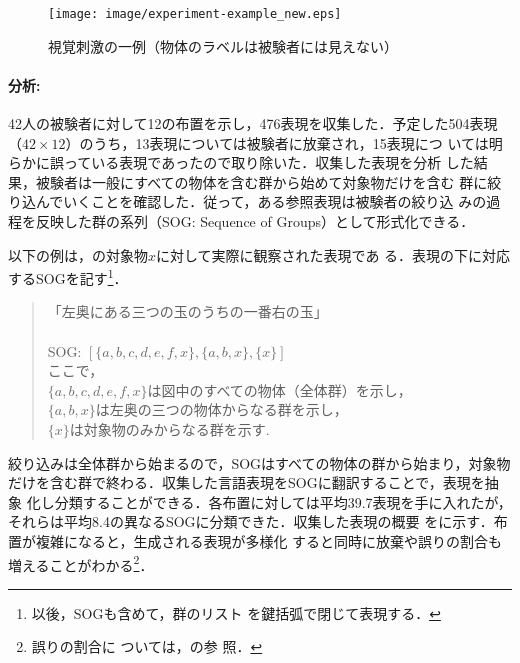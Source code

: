 \documentclass{nlp}
\begin{document}
\begin{figure}[tb]
  \centering
      \texttt{[image: image/experiment-example\_new.eps]}
      \caption{視覚刺激の一例（物体のラベルは被験者には見えない）}
      \label{experiment}
\end{figure}

\paragraph{分析:}

42人の被験者に対して12の布置を示し，476表現を収集した．予定した504表現
（$42 \times 12$）のうち，13表現については被験者に放棄され，15表現につ
いては明らかに誤っている表現であったので取り除いた．収集した表現を分析
した結果，被験者は一般にすべての物体を含む群から始めて対象物だけを含む
群に絞り込んでいくことを確認した．従って，ある参照表現は被験者の絞り込
みの過程を反映した群の系列（SOG: Sequence of Groups）として形式化できる．

以下の例は，の対象物$x$に対して実際に観察された表現であ
る．表現の下に対応するSOGを記す\footnote{以後，SOGも含めて，群のリスト
  を鍵括弧で閉じて表現する．}．

\begin{center}
  \begin{minipage}{.75\linewidth}
\begin{quote}
  「左奥にある三つの玉のうちの一番右の玉」\\ 
  \\
  SOG: $[\{a,b,c,d,e,f,x\},\{a,b,x\},\{x\}]$
  \\
  ここで，\\
  $\{a,b,c,d,e,f,x\}$は図中のすべての物体（全体群）を示し，\\
  $\{a,b,x\}$は左奥の三つの物体からなる群を示し，\\
  $\{x\}$は対象物のみからなる群を示す.\\
\end{quote}
  \end{minipage}
\end{center}

絞り込みは全体群から始まるので，SOGはすべての物体の群から始まり，対象物
だけを含む群で終わる．収集した言語表現をSOGに翻訳することで，表現を抽象
化し分類することができる．各布置に対しては平均39.7表現を手に入れたが，
それらは平均8.4の異なるSOGに分類できた．収集した表現の概要
をに示す．布置が複雑になると，生成される表現が多様化
すると同時に放棄や誤りの割合も増えることがわかる\footnote{誤りの割合に
  ついては，の参
  照．}．
\end{document}
